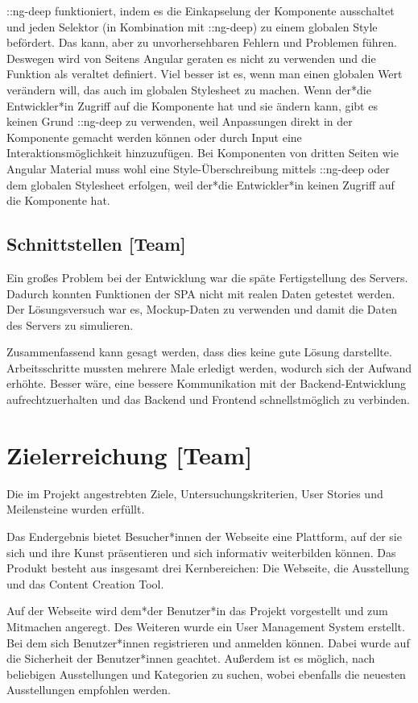 ::ng-deep funktioniert, indem es die Einkapselung der Komponente ausschaltet und jeden Selektor (in Kombination mit ::ng-deep) zu einem globalen Style befördert. Das kann, aber zu unvorhersehbaren Fehlern und Problemen führen. Deswegen wird von Seitens Angular geraten es nicht zu verwenden und die Funktion als veraltet definiert. Viel besser ist es, wenn man einen globalen Wert verändern will, das auch im globalen Stylesheet zu machen.
Wenn der*die Entwickler*in Zugriff auf die Komponente hat und sie ändern kann, gibt es keinen Grund ::ng-deep zu verwenden, weil Anpassungen direkt in der Komponente gemacht werden können oder durch Input eine Interaktionsmöglichkeit hinzuzufügen. Bei Komponenten von dritten Seiten wie Angular Material muss wohl eine Style-Überschreibung mittels ::ng-deep oder dem globalen Stylesheet erfolgen, weil der*die Entwickler*in keinen Zugriff auf die Komponente hat. \cite{AngularComponentsStyleNgDEEP, UnderstandingNgDeep}

\subsection{Schnittstellen [Team]}
Ein großes Problem bei der Entwicklung war die späte Fertigstellung des Servers.
Dadurch konnten Funktionen der SPA nicht mit realen Daten getestet werden. Der Lösungsversuch war es, Mockup-Daten zu verwenden und damit die Daten des Servers zu simulieren.  

Zusammenfassend kann gesagt werden, dass dies keine gute Lösung darstellte. Arbeitsschritte mussten mehrere Male erledigt werden, wodurch sich der Aufwand erhöhte. Besser wäre, eine bessere Kommunikation mit der Backend-Entwicklung aufrechtzuerhalten und das Backend und Frontend schnellstmöglich zu verbinden. 

\section{Zielerreichung [Team]}
Die im Projekt angestrebten Ziele, Untersuchungskriterien, User Stories und Meilensteine wurden erfüllt.

Das Endergebnis bietet Besucher*innen der Webseite eine Plattform, auf der sie sich und ihre Kunst präsentieren und sich informativ weiterbilden können. Das Produkt besteht aus insgesamt drei Kernbereichen: Die Webseite, die Ausstellung und das Content Creation Tool.

Auf der Webseite wird dem*der Benutzer*in das Projekt vorgestellt und zum Mitmachen angeregt. Des Weiteren wurde ein User Management System erstellt. Bei dem sich Benutzer*innen registrieren und anmelden können. Dabei wurde auf die Sicherheit der Benutzer*innen geachtet. Außerdem ist es möglich, nach beliebigen Ausstellungen und Kategorien zu suchen, wobei ebenfalls die neuesten Ausstellungen empfohlen werden.

